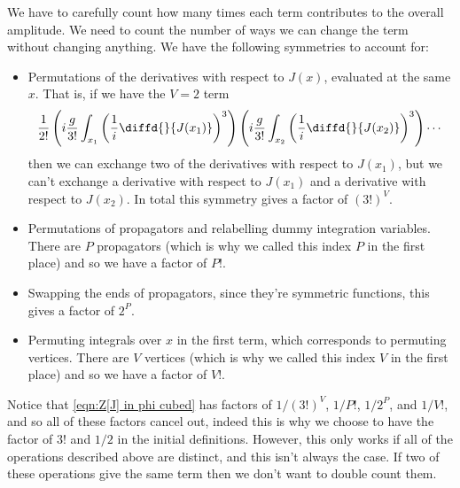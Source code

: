 \documentclass[fleqn]{NotesClass}
\begin{document}
    We have to carefully count how many times each term contributes to the overall amplitude.
    We need to count the number of ways we can change the term without changing anything.
    We have the following symmetries to account for:
    \begin{itemize}
        \item Permutations of the derivatives with respect to \(J(x)\), evaluated at the same \(x\).
        That is, if we have the \(V = 2\) term
        \begin{equation}
            \frac{1}{2!} \left( i\frac{g}{3!} \int_{x_1} \left( \frac{1}{i}\diffd{}{J(x_1)} \right)^3 \right) \left( i\frac{g}{3!} \int_{x_2} \left( \frac{1}{i}\diffd{}{J(x_2)} \right)^3 \right) \dotsm
        \end{equation}
        then we can exchange two of the derivatives with respect to \(J(x_1)\), but we can't exchange a derivative with respect to \(J(x_1)\) and a derivative with respect to \(J(x_2)\).
        In total this symmetry gives a factor of \((3!)^V\).
        \item Permutations of propagators and relabelling dummy integration variables.
        There are \(P\) propagators (which is why we called this index \(P\) in the first place) and so we have a factor of \(P!\).
        \item Swapping the ends of propagators, since they're symmetric functions, this gives a factor of \(2^P\).
        \item Permuting integrals over \(x\) in the first term, which corresponds to permuting vertices.
        There are \(V\) vertices (which is why we called this index \(V\) in the first place) and so we have a factor of \(V!\).
    \end{itemize}
    
    Notice that \cref{eqn:Z[J] in phi cubed} has factors of \(1/(3!)^V\), \(1/P!\), \(1/2^P\), and \(1/V!\), and so all of these factors cancel out, indeed this is why we choose to have the factor of \(3!\) and \(1/2\) in the initial definitions.
    However, this only works if all of the operations described above are distinct, and this isn't always the case.
    If two of these operations give the same term then we don't want to double count them.
    
\end{document}
